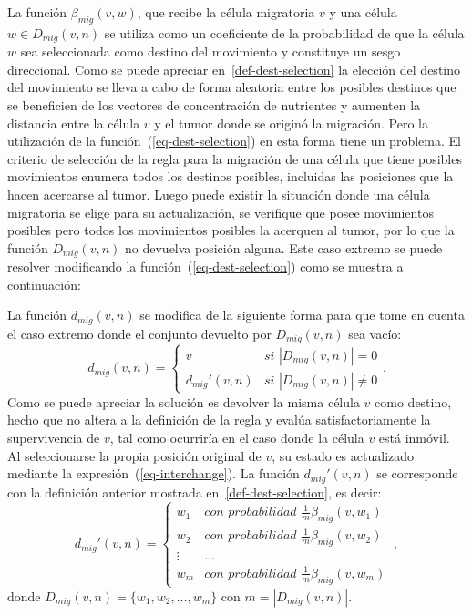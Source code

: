 La funci\'on $\beta_{mig}(v,w)$, que recibe la c\'elula migratoria $v$ y una c\'elula $w \in D_{mig}(v,n)$ se utiliza como un coeficiente de la probabilidad de que la c\'elula $w$ sea seleccionada como destino del movimiento y constituye un sesgo direccional. Como se puede apreciar en~\ref{def-dest-selection} la elecci\'on del destino del movimiento se lleva a cabo de forma aleatoria entre los posibles destinos que se beneficien de los vectores de concentraci\'on de nutrientes y aumenten la distancia entre la c\'elula $v$ y el tumor donde se origin\'o la migraci\'on. Pero la utilizaci\'on de la funci\'on~(\ref{eq-dest-selection}) en esta forma tiene un problema. El criterio de selecci\'on de la regla para la migraci\'on de una c\'elula que tiene posibles movimientos enumera todos los destinos posibles, incluidas las posiciones que la hacen acercarse al tumor. Luego puede existir la situaci\'on donde una c\'elula migratoria se elige para su actualizaci\'on, se verifique que posee movimientos posibles pero todos los movimientos posibles la acerquen al tumor, por lo que la funci\'on $D_{mig}(v,n)$ no devuelva posici\'on alguna. Este caso extremo se puede resolver modificando la funci\'on~(\ref{eq-dest-selection}) como se muestra a continuaci\'on:

\begin{definition}
\label{def-dest-selection-2}
La funci\'on $d_{mig}(v,n)$ se modifica de la siguiente forma para que tome en cuenta el caso extremo donde el conjunto devuelto por $D_{mig}(v,n)$ sea vac\'io:
\begin{equation}
d_{mig}(v,n) = \left\lbrace
	\begin{array}{ll}
		v & \textit{si } |D_{mig}(v,n)|=0\\
		d_{mig}'(v,n)& \textit{si } |D_{mig}(v,n)|\neq 0		
	\end{array}
\right.. \label{eq-dest-selection-3}
\end{equation}
Como se puede apreciar la soluci\'on es devolver la misma c\'elula $v$ como destino, hecho que no altera a la definici\'on de la regla y eval\'ua satisfactoriamente la supervivencia de $v$, tal como ocurrir\'ia en el caso donde la c\'elula $v$ est\'a inm\'ovil. Al seleccionarse la propia posici\'on original de $v$, su estado es actualizado mediante la expresi\'on~(\ref{eq-interchange}). La funci\'on $d_{mig}'(v,n)$ se corresponde con la definici\'on anterior mostrada en~\ref{def-dest-selection}, es decir:
\begin{equation}
d_{mig}'(v,n) = \left\lbrace
	\begin{array}{ll}
		w_1 & \textit{con probabilidad } \frac{1}{m} \beta_{mig}(v,w_1)\\
		w_2 & \textit{con probabilidad } \frac{1}{m} \beta_{mig}(v,w_2)\\
		\vdots & \ldots\\
		w_m & \textit{con probabilidad } \frac{1}{m} \beta_{mig}(v,w_m)
	\end{array}\
\right., \label{eq-dest-selection-4}
\end{equation}
donde $D_{mig}(v,n)= \lbrace w_1,w_2,\ldots,w_m \rbrace$ con $m = |D_{mig}(v,n)|$.
\end{definition}

